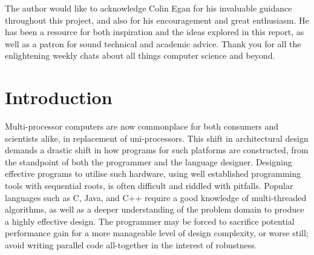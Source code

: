 The author would like to acknowledge Colin Egan for his invaluable guidance throughout this project, 
and also for his encouragement and great enthusiasm. He has been a resource for both inspiration and the ideas
explored in this report, as well as a patron for sound technical and academic advice.
Thank you for all the enlightening weekly chats about all things computer science and beyond.

\clearpage

\setcounter{page}{1}
\tableofcontents

\chapter{Introduction}


Multi-processor computers are now commonplace for both consumers and scientists alike, in replacement of uni-processors. 
This shift in architectural design demands a drastic shift in how programs for such platforms are constructed, 
from the standpoint of both the programmer and the language designer. 
Designing effective programs to utilise such hardware, using well established programming tools with sequential roots,
is often difficult and riddled with pitfalls. Popular languages such as C, Java, and C++ require a good knowledge of multi-threaded 
algorithms, as well as a deeper understanding of the problem domain to produce a highly effective design.
The programmer may be forced to sacrifice potential performance gain for a more manageable level of design complexity,
or worse still; avoid writing parallel code all-together in the interest of robustness.

